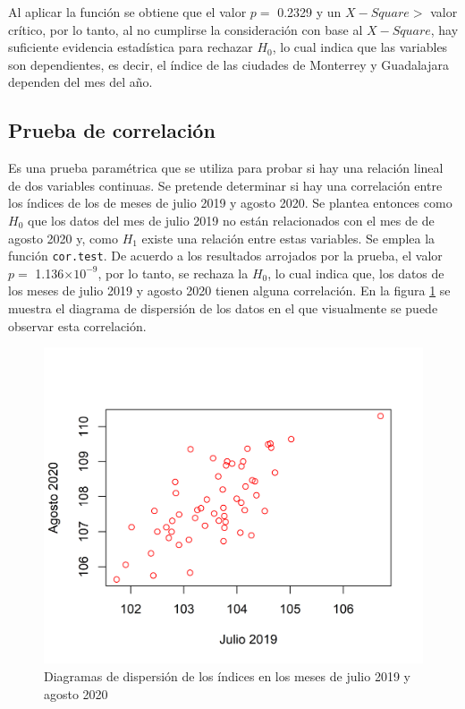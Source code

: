 \documentclass{article}
\begin{document}
Al aplicar la función se obtiene que el valor $p =$ 0.2329 y un $X-Square >$ valor crítico, por lo tanto, al no cumplirse la consideración con base al $X-Square$, hay suficiente evidencia estadística para rechazar $H_{0}$, lo cual indica que las variables son dependientes, es decir, el índice de las ciudades de Monterrey y Guadalajara dependen del mes del año.

   
\subsection{Prueba de correlación}
    
Es una prueba paramétrica que se utiliza para probar si hay una relación lineal de dos variables continuas. Se pretende determinar si hay una correlación entre los índices de los de meses de julio 2019 y agosto 2020. Se plantea entonces como $H_{0}$ que los datos del mes de julio 2019 no están relacionados con el mes de de agosto 2020 y, como $H_{1}$ existe una relación entre estas variables. Se emplea la función \texttt{cor.test}. De acuerdo a los resultados arrojados por la prueba, el valor $p =$ 1.136$\times 10^{-9}$, por lo tanto, se rechaza la $H_{0}$, lo cual indica que, los datos de los meses de julio 2019 y agosto 2020 tienen alguna correlación. En la figura \ref{correlacion} se muestra el diagrama de dispersión de los datos en el que visualmente se puede observar esta correlación.
    

\begin{figure}
\centering
\includegraphics[scale=0.7]{Figures/correlacion.png}
\caption{Diagramas de dispersión de los índices en los meses de julio 2019 y agosto 2020}
\label{correlacion}
\end{figure}
\end{document}
